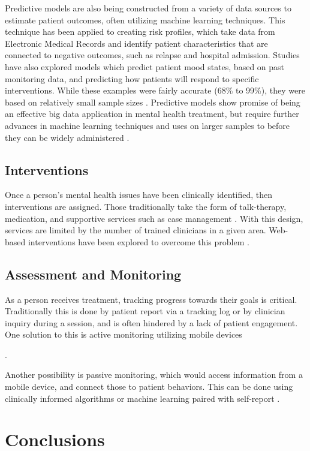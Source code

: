 \documentclass[sigconf]{acmart}
\begin{document}
Predictive models are also being constructed from a variety of data sources to estimate patient outcomes, often utilizing machine learning techniques. \cite{bigdatabipolar} This technique has been applied to creating risk profiles, which take data from Electronic Medical Records and identify patient characteristics that are connected to negative outcomes, such as relapse and hospital admission. Studies have also explored models which predict patient mood states, based on past monitoring data, and predicting how patients will respond to specific interventions. While these examples were fairly accurate (68\% to 99\%), they were based on relatively small sample sizes \cite{machinelearnbipolar}.  Predictive models show promise of being an effective big data application in mental health treatment, but require further advances in machine learning techniques and uses on larger samples to before they can be widely administered \cite{bigdatabipolar}.
\subsection{Interventions}
Once a person's mental health issues have been clinically identified, then interventions are assigned. Those traditionally take the form of talk-therapy, medication, and supportive services such as case management \cite{samhsatx}. With this design, services are limited by the number of trained clinicians in a given area. Web-based interventions have been explored to overcome this problem \cite{bitreview}.
\subsection{Assessment and Monitoring}
As a person receives treatment, tracking progress towards their goals is critical. Traditionally this is done by patient report via a tracking log or by clinician inquiry during a session, and is often hindered by a lack of patient engagement. One solution to this is active monitoring utilizing mobile devices \cite{bitreview} 

\cite{bigdatabipolar}.

Another possibility is passive monitoring, which would access information from a mobile device, and connect those to patient behaviors. This can be done using clinically informed algorithms or machine learning paired with self-report \cite{bitreview} \cite{bigdatabipolar}. 






\section{Conclusions}
\end{document}
